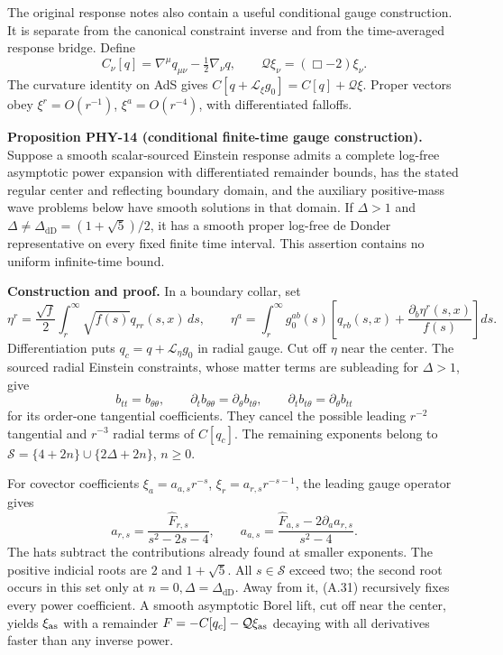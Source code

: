 The original response notes also contain a useful conditional gauge construction. It is separate from the canonical constraint inverse and from the time-averaged response bridge. Define \[
C_\nu[q]=\nabla^\mu q_{\mu\nu}-\tfrac12\nabla_\nu q,
\qquad \mathcal Q\xi_\nu=(\Box-2)\xi_\nu .
\] The curvature identity on AdS gives \(C[q+\mathcal L_\xi g_0]=C[q]+\mathcal Q\xi\). Proper vectors obey \(\xi^r=O(r^{-1})\), \(\xi^a=O(r^{-4})\), with differentiated falloffs.

\textbf{Proposition PHY-14 (conditional finite-time gauge construction).} Suppose a smooth scalar-sourced Einstein response admits a complete log-free asymptotic power expansion with differentiated remainder bounds, has the stated regular center and reflecting boundary domain, and the auxiliary positive-mass wave problems below have smooth solutions in that domain. If \(\Delta>1\) and \(\Delta\ne\Delta_{\mathrm{dD}}=(1+\sqrt5)/2\), it has a smooth proper log-free de Donder representative on every fixed finite time interval. This assertion contains no uniform infinite-time bound.

\textbf{Construction and proof.} In a boundary collar, set \[
\eta^r=\frac{\sqrt f}{2}\int_r^\infty\sqrt{f(s)}q_{rr}(s,x)\,ds,
\qquad
\eta^a=\int_r^\infty g_0^{ab}(s)
\left[q_{rb}(s,x)+\frac{\partial_b\eta^r(s,x)}{f(s)}\right]ds.
\tag{A.30}
\] Differentiation puts \(q_c=q+\mathcal L_\eta g_0\) in radial gauge. Cut off \(\eta\) near the center. The sourced radial Einstein constraints, whose matter terms are subleading for \(\Delta>1\), give \[
b_{tt}=b_{\theta\theta},\qquad
\partial_tb_{\theta\theta}=\partial_\theta b_{t\theta},\qquad
\partial_tb_{t\theta}=\partial_\theta b_{tt}
\] for its order-one tangential coefficients. They cancel the possible leading \(r^{-2}\) tangential and \(r^{-3}\) radial terms of \(C[q_c]\). The remaining exponents belong to \(\mathcal S=\{4+2n\}\cup\{2\Delta+2n\}\), \(n\ge0\).

For covector coefficients \(\xi_a=a_{a,s}r^{-s}\), \(\xi_r=a_{r,s}r^{-s-1}\), the leading gauge operator gives \[
a_{r,s}=\frac{\widehat F_{r,s}}{s^2-2s-4},\qquad
a_{a,s}=\frac{\widehat F_{a,s}-2\partial_aa_{r,s}}{s^2-4}.
\tag{A.31}
\] The hats subtract the contributions already found at smaller exponents. The positive indicial roots are \(2\) and \(1+\sqrt5\). All \(s\in\mathcal S\) exceed two; the second root occurs in this set only at \(n=0,\Delta=\Delta_{\mathrm{dD}}\). Away from it, (A.31) recursively fixes every power coefficient. A smooth asymptotic Borel lift, cut off near the center, yields \(\xi_{\rm as}\) with a remainder \(F=-C[q_c]-\mathcal Q\xi_{\rm as}\) decaying with all derivatives faster than any inverse power.

